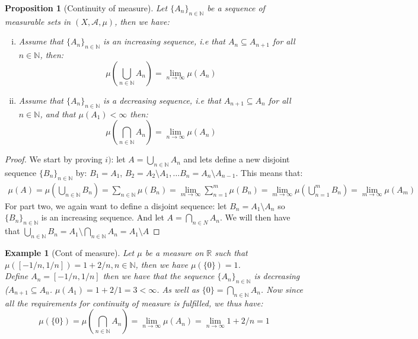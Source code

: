 \documentclass{article}
\newcommand{\R}{\mathbb{R}}
\newcommand{\N}{\mathbb{N}}
\newcommand{\A}{\mathcal{A}}
\newtheorem{prop}{Proposition}
\newtheorem{ex}{Example}
\newtheorem{proof}{Proof}
\begin{document}
\begin{prop}[Continuity of measure]
Let $\{A_{n}\}_{n\in \N}$ be a sequence of measurable sets in $(X, \A, \mu)$, then we have: 
\begin{enumerate}[i)]
    \item Assume that $\{A_{n}\}_{n\in \N}$ is an increasing sequence, i.e that $A_{n} \subseteq A_{n+1}$ for all $n\in \N$, then: 
    \[\mu\left(\bigcup_{n\in \N}A_{n}\right) = \lim_{n\to \infty}\mu(A_{n})
    \]
    \item Assume that $\{A_{n}\}_{n\in \N}$ is a decreasing sequence, i.e that $A_{n+1} \subseteq A_{n}$ for all $n\in \N$, and that $\mu(A_{1}) < \infty$ then: 
    \[\mu\left(\bigcap_{n\in \N}A_{n}\right) = \lim_{n\to \infty}\mu(A_{n})
    \]
\end{enumerate}
\end{prop}

\begin{proof}
We start by proving $i)$: let $A = \bigcup_{n\in \N}A_{n}$ and lets define a new disjoint sequence $\{B_{n}\}_{n\in \N}$ by: $B_{1} = A_{1}$, $B_{2} = A_{2}\setminus A_{1}, \dots B_{n} = A_{n}\setminus A_{n-1}$. This means that: 
\begin{align*}
\mu(A) = \mu(\bigcup_{n\in \N}B_{n}) = \sum_{n\in \N}\mu(B_{n}) = \lim_{m\to \infty}\sum_{n=1}^{m}\mu(B_{n}) = \lim_{m\to \infty}\mu\left(\bigcup_{n=1}^{m}B_{n}\right) = \lim_{m\to \infty}\mu(A_{m})    
\end{align*} 
For part two, we again want to define a disjoint sequence: let $B_{n} = A_{1}\setminus A_{n}$ so $\{B_{n}\}_{n\in \N}$ is an increasing sequence. And let $A = \bigcap_{n\in N}A_{n}$. We will then have that $\bigcup_{n\in \N}B_{n} = A_{1}\setminus \bigcap_{n\in \N}A_{n} = A_{1}\setminus A$
\end{proof}

\begin{ex}[Cont of measure]
Let $\mu$ be a measure on $\R$ such that\\
$\mu([-1/n,1/n]) = 1 + 2/n, n\in \N$, then we have $\mu(\{0\}) = 1$.\\ 
Define $A_{n} = [-1/n, 1/n]$ then we have that the sequence $\{A_{n}\}_{n\in \N}$ is decreasing ($A_{n+1}\subseteq A_{n}$. $\mu(A_{1}) = 1 + 2/1 = 3 < \infty$. As well as $\{0\} = \bigcap_{n\in \N}A_{n}$. Now since all the requirements for continuity of measure is fulfilled, we thus have: 
\[\mu(\{0\}) = \mu(\bigcap_{n\in \N}A_{n}) = \lim_{n\to \infty}\mu(A_{n}) 
= \lim_{n\to \infty} 1 + 2/n = 1
\]
\end{ex} 
\end{document}
